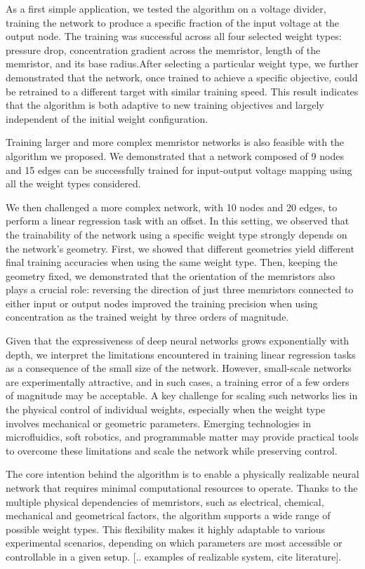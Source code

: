 \documentclass[reprint,superscriptaddress,prb,showkeys]{revtex4-2}
\begin{document}
As a first simple application, we tested the algorithm on a voltage divider, training the network to produce a specific fraction of the input voltage at the output node. The training was successful across all four selected weight types: pressure drop, concentration gradient across the memristor, length of the memristor, and its base radius.After selecting a particular weight type, we further demonstrated that the network, once trained to achieve a specific objective, could be retrained to a different target with similar training speed. This result indicates that the algorithm is both adaptive to new training objectives and largely independent of the initial weight configuration.

Training larger and more complex memristor networks is also feasible with the algorithm we proposed. We demonstrated that a network composed of 9 nodes and 15 edges can be successfully trained for input-output voltage mapping using all the weight types considered.

We then challenged a more complex network, with 10 nodes and 20 edges, to perform a linear regression task with an offset. In this setting, we observed that the trainability of the network using a specific weight type strongly depends on the network's geometry. First, we showed that different geometries yield different final training accuracies when using the same weight type. Then, keeping the geometry fixed, we demonstrated that the orientation of the memristors also plays a crucial role: reversing the direction of just three memristors connected to either input or output nodes improved the training precision when using concentration as the trained weight by three orders of magnitude.

Given that the expressiveness of deep neural networks grows exponentially with depth\cite{big_neuralnet1, big_neuralnet2}, we interpret the limitations encountered in training linear regression tasks as a consequence of the small size of the network. However, small-scale networks are experimentally attractive, and in such cases, a training error of a few orders of magnitude may be acceptable. A key challenge for scaling such networks lies in the physical control of individual weights, especially when the weight type involves mechanical or geometric parameters. Emerging technologies in microfluidics, soft robotics, and programmable matter may provide practical tools to overcome these limitations and scale the network while preserving control.

The core intention behind the algorithm is to enable a physically realizable neural network that requires minimal computational resources to operate. Thanks to the multiple physical dependencies of memristors, such as electrical, chemical, mechanical and geometrical factors, the algorithm supports a wide range of possible weight types. This flexibility makes it highly adaptable to various experimental scenarios, depending on which parameters are most accessible or controllable in a given setup. [.. examples of realizable system, cite literature].
\end{document}
